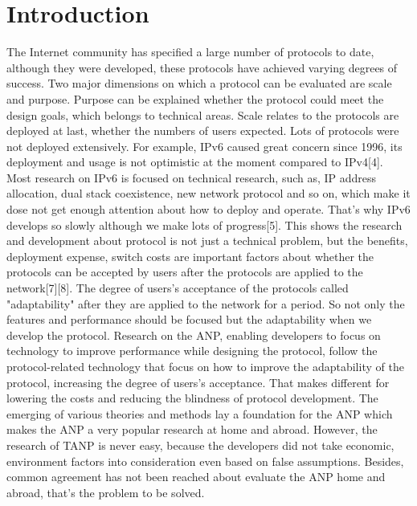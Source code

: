 \documentclass{article}
\begin{document}
\section{Introduction}
The Internet community has specified a large number of protocols to date, although they were developed, these
protocols have achieved varying degrees of success. Two major dimensions on which a protocol can be evaluated
are scale and purpose. Purpose can be explained whether the protocol could meet the design goals, which belongs
to technical areas. Scale relates to the protocols are deployed at last, whether the numbers of users expected.
Lots of protocols were not deployed extensively. For example, IPv6 caused great concern since 1996, its deployment
and usage is not optimistic at the moment compared to IPv4[4]. Most research on IPv6 is focused on technical
research, such as, IP address allocation, dual stack coexistence, new network protocol and so on, which make
it dose not get enough attention about how to deploy and operate. That's why IPv6 develops so slowly although
we make lots of progress[5]. This shows the research and development about protocol is not just a technical
problem, but the benefits, deployment expense, switch costs are important factors about whether the protocols
can be accepted by users after the protocols are applied to the network[7][8]. The degree of users's acceptance
of the protocols called "adaptability" after they are applied to the network for a period. So not only the
features and performance should be focused but the adaptability when we develop the protocol. Research on the
ANP, enabling developers to focus on technology to improve performance while designing the protocol, follow
the protocol-related technology that focus on how to improve the adaptability of the protocol, increasing the
degree of users's acceptance. That makes different for lowering the costs and reducing the blindness of protocol
development. The emerging of various theories and methods lay a foundation for the ANP which makes the ANP a very
popular research at home and abroad. However, the research of TANP is never easy, because the developers did not
take economic, environment factors into consideration even based on false assumptions. Besides, common agreement
has not been reached about evaluate the ANP home and abroad, that's the problem to be solved.
\end{document}
